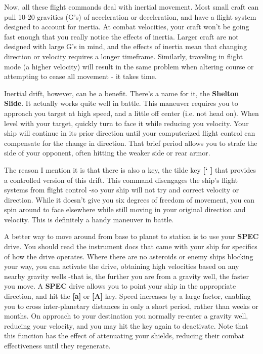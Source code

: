 \documentclass{article}
\begin{document}
Now, all these flight commands deal with inertial movement. Most small craft can pull 10-20 gravities (G's) of acceleration or deceleration, and have a flight system designed to account for inertia. At combat velocities, your craft won't be going fast enough that you really notice the effects of inertia. Larger craft are not designed with large G's in mind, and the effects of inertia mean that changing direction or velocity requires a longer timeframe. Similarly, traveling in flight mode (a higher velocity) will result in the same problem when altering course or attempting to cease all movement - it takes time. 

Inertial drift, however, can be a benefit. There's a name for it, the \textbf{Shelton Slide}. It actually works quite well in battle. This maneuver requires you to approach you target at high speed, and a little off center (i.e. not head on). When level with your target, quickly turn to face it while reducing you velocity. Your ship will continue in its prior direction until your computerized flight control can compensate for the change in direction. That brief period allows you to strafe the side of your opponent, often hitting the weaker side or rear armor. 



The reason I mention it is that there is also a key, the tilde key \textbf{[` ] }that provides a controlled version of this drift. This command disengages the ship's flight systems from flight control -so your ship will not try and correct velocity or direction. While it doesn't give you six degrees of freedom of movement, you can spin around to face elsewhere while still moving in your original direction and velocity. This is definitely a handy maneuver in battle. 

A better way to move around from base to planet to station is to use your \textbf{SPEC }drive. You should read the instrument docs that came with your ship for specifics of how the drive operates. Where there are no asteroids or enemy ships blocking your way, you can activate the drive, obtaining high velocities based on any nearby gravity wells -that is, the further you are from a gravity well, the faster you move. A \textbf{SPEC }drive allows you to point your ship in the appropriate direction, and hit the \textbf{[a] }or \textbf{[A] }key. Speed increases by a large factor, enabling you to cross inter-planetary distances in only a short period, rather than weeks or months. On approach to your destination you normally re-enter a gravity well, reducing your velocity, and you may hit the key again to deactivate. Note that this function has the effect of attenuating your shields, reducing their combat effectiveness until they regenerate. 
\end{document}
